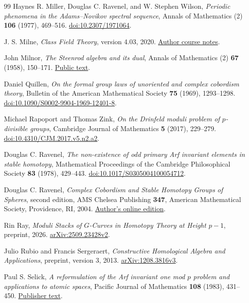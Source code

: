 \documentclass[11pt]{article}
\theoremstyle{definition}
\theoremstyle{remark}
\numberwithin{equation}{section}
\begin{document}
\begin{thebibliography}{99}
Haynes R. Miller, Douglas C. Ravenel, and W. Stephen Wilson,
\emph{Periodic phenomena in the Adams--Novikov spectral sequence},
Annals of Mathematics (2) \textbf{106} (1977), 469--516.
\href{https://doi.org/10.2307/1971064}{doi:10.2307/1971064}.

J. S. Milne,
\emph{Class Field Theory}, version 4.03, 2020.
\href{https://www.jmilne.org/math/CourseNotes/CFT.pdf}{Author course notes}.

John Milnor,
\emph{The Steenrod algebra and its dual},
Annals of Mathematics (2) \textbf{67} (1958), 150--171.
\href{https://www.sas.rochester.edu/mth/sites/doug-ravenel/otherpapers/Milnor-A.pdf}{Public text}.

Daniel Quillen,
\emph{On the formal group laws of unoriented and complex cobordism theory},
Bulletin of the American Mathematical Society \textbf{75} (1969), 1293--1298.
\href{https://doi.org/10.1090/S0002-9904-1969-12401-8}{doi:10.1090/S0002-9904-1969-12401-8}.

Michael Rapoport and Thomas Zink,
\emph{On the Drinfeld moduli problem of $p$-divisible groups},
Cambridge Journal of Mathematics \textbf{5} (2017), 229--279.
\href{https://doi.org/10.4310/CJM.2017.v5.n2.a2}{doi:10.4310/CJM.2017.v5.n2.a2}.

Douglas C. Ravenel,
\emph{The non-existence of odd primary Arf invariant elements
in stable homotopy},
Mathematical Proceedings of the Cambridge Philosophical Society
\textbf{83} (1978), 429--443.
\href{https://doi.org/10.1017/S0305004100054712}{doi:10.1017/S0305004100054712}.

Douglas C. Ravenel,
\emph{Complex Cobordism and Stable Homotopy Groups of Spheres},
second edition, AMS Chelsea Publishing \textbf{347},
American Mathematical Society, Providence, RI, 2004.
\href{https://www.sas.rochester.edu/mth/sites/doug-ravenel/mybooks/ravenel.pdf}{Author's online edition}.

Rin Ray,
\emph{Moduli Stacks of $G$-Curves in Homotopy Theory at Height $p-1$},
preprint, 2026.
\href{https://arxiv.org/abs/2509.23428v2}{arXiv:2509.23428v2}.

Julio Rubio and Francis Sergeraert,
\emph{Constructive Homological Algebra and Applications},
preprint, version 3, 2013.
\href{https://arxiv.org/abs/1208.3816v3}{arXiv:1208.3816v3}.

Paul S. Selick,
\emph{A reformulation of the Arf invariant one mod $p$ problem
and applications to atomic spaces},
Pacific Journal of Mathematics \textbf{108} (1983), 431--450.
\href{https://msp.org/pjm/1983/108-2/pjm-v108-n2-p12-s.pdf}{Publisher text}.


\end{thebibliography}
\end{document}
